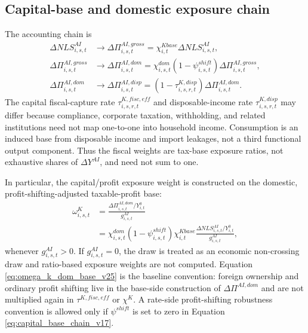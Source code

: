 \documentclass[11pt,a4paper]{article}
\begin{document}
\subsection{Capital-base and domestic exposure chain}

The accounting chain is
\begin{equation}\label{eq:capital_base_chain_v17}
\begin{split}
    \Delta NLS^{AI}_{i,s,t}
    &\rightarrow \Delta\Pi^{AI,gross}_{i,s,t}
    =\chi^{Kbase}_{i,t}\Delta NLS^{AI}_{i,s,t},\\
    \Delta\Pi^{AI,gross}_{i,s,t}
    &\rightarrow \Delta\Pi^{AI,dom}_{i,s,t}
    =\chi^{dom}_{i,s,t}(1-\psi^{shift}_{i,s,t})\Delta\Pi^{AI,gross}_{i,s,t},\\
    \Delta\Pi^{AI,dom}_{i,s,t}
    &\rightarrow \Delta\Pi^{AI,disp}_{i,s,t}
    =(1-\tau^{K,disp}_{i,s,r,t})\Delta\Pi^{AI,dom}_{i,s,t}.
\end{split}
\end{equation}
The capital fiscal-capture rate $\tau^{K,fisc,eff}_{i,s,r,t}$ and disposable-income rate $\tau^{K,disp}_{i,s,r,t}$ may differ because compliance, corporate taxation, withholding, and related institutions need not map one-to-one into household income. Consumption is an induced base from disposable income and import leakages, not a third functional output component. Thus the fiscal weights are tax-base exposure ratios, not exhaustive shares of $\Delta Y^{AI}$, and need not sum to one.

In particular, the capital/profit exposure weight is constructed on the domestic, profit-shifting-adjusted taxable-profit base:
\begin{equation}\label{eq:omega_k_dom_base_v25}
\begin{split}
    \omega^K_{i,s,t}
    &=\frac{\Delta\Pi^{AI,dom}_{i,s,t}/Y^0_{i,t}}{g^{AI}_{i,s,t}} \\
    &=\chi^{dom}_{i,s,t}(1-\psi^{shift}_{i,s,t})\chi^{Kbase}_{i,t}
      \frac{\Delta NLS^{AI}_{i,s,t}/Y^0_{i,t}}{g^{AI}_{i,s,t}},
\end{split}
\end{equation}
whenever $g^{AI}_{i,s,t}>0$. If $g^{AI}_{i,s,t}=0$, the draw is treated as an economic non-crossing draw and ratio-based exposure weights are not computed. Equation \eqref{eq:omega_k_dom_base_v25} is the baseline convention: foreign ownership and ordinary profit shifting live in the base-side construction of $\Delta\Pi^{AI,dom}$ and are not multiplied again in $\tau^{K,fisc,eff}$ or $\chi^K$. A rate-side profit-shifting robustness convention is allowed only if $\psi^{shift}$ is set to zero in Equation \eqref{eq:capital_base_chain_v17}.
\end{document}
